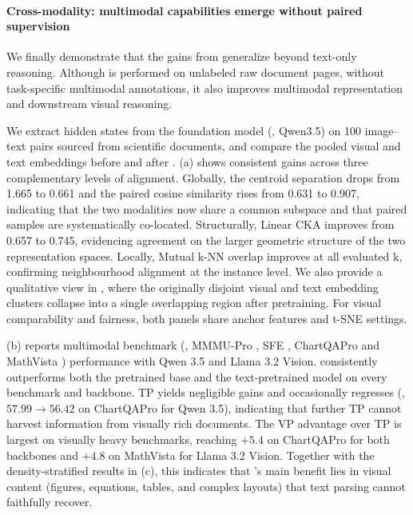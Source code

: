 \paragraph{Cross-modality: multimodal capabilities emerge without paired supervision}
\label{sec:results_alignment}
We finally demonstrate that the gains from \methodname generalize beyond text-only reasoning. 
Although \methodname is performed on unlabeled raw document pages, without task-specific multimodal annotations,
it also improves multimodal representation and downstream visual reasoning.



We extract hidden states from the foundation model (\ie, Qwen3.5) on 100 image–text pairs sourced from scientific documents, 
and compare the pooled visual and text embeddings before and after \methodname. 
 (a) shows consistent gains across three complementary levels of alignment. 
Globally, the centroid separation \citep{liang2022mind} drops from 1.665 to 0.661 and the paired cosine similarity rises from 0.631 to 0.907, 
indicating that the two modalities now share a common subspace and that paired samples are systematically co-located. 
Structurally, Linear CKA \citep{kornblith2019similarity} improves from 0.657 to 0.745, 
evidencing agreement on the larger geometric structure of the two representation spaces. 
Locally, Mutual k-NN overlap \citep{huh2024platonic} improves at all evaluated k, confirming neighbourhood alignment at the instance level. 
We also provide a qualitative view in , 
where the originally disjoint visual and text embedding clusters collapse into a single overlapping region after \methodname pretraining.
For visual comparability and fairness, both panels share anchor features and t-SNE settings.




 (b) reports multimodal benchmark (\ie, MMMU-Pro \citep{yue2025mmmu}, SFE \citep{zhou2026scientists}, ChartQAPro \citep{masry2025chartqapro} and MathVista \citep{lu2024mathvista}) performance with Qwen 3.5 and Llama 3.2 Vision. 
\methodname consistently outperforms both the pretrained base and the text-pretrained model on every benchmark and backbone.
TP yields negligible gains and occasionally regresses (\eg, $57.99 \to 56.42$ on ChartQAPro for Qwen 3.5), indicating that   
further TP cannot harvest information from visually rich documents. The VP advantage over TP is largest on
visually heavy benchmarks, reaching $+5.4$ on ChartQAPro for both backbones and $+4.8$ on MathVista for Llama 3.2 Vision.
Together with the density-stratified results in  (c), this indicates that \methodname{}'s main benefit lies in
visual content (figures, equations, tables, and complex layouts) that text parsing cannot faithfully recover.


